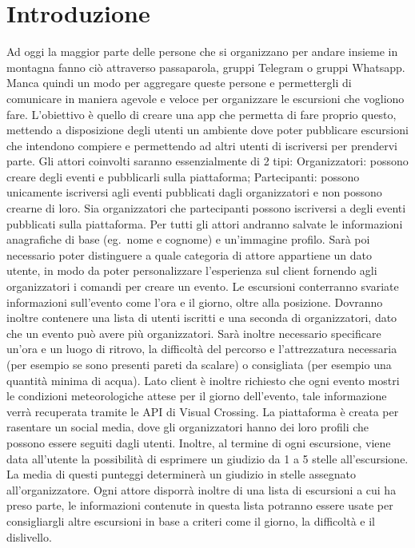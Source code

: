 \section{Introduzione}
Ad oggi la maggior parte delle persone che si organizzano per andare insieme in montagna fanno ciò attraverso passaparola, gruppi Telegram o gruppi Whatsapp. Manca quindi un modo per aggregare queste persone e permettergli di comunicare in maniera agevole e veloce per organizzare le escursioni che vogliono fare.
L'obiettivo è quello di creare una app che permetta di fare proprio questo, mettendo a disposizione degli utenti un ambiente dove poter pubblicare escursioni che intendono compiere e permettendo ad altri utenti di iscriversi per prendervi parte.
Gli attori coinvolti saranno essenzialmente di 2 tipi:
Organizzatori: possono creare degli eventi e pubblicarli sulla piattaforma;
Partecipanti: possono unicamente iscriversi agli eventi pubblicati dagli organizzatori e non possono crearne di loro. Sia organizzatori che partecipanti possono iscriversi a degli eventi pubblicati sulla piattaforma.
Per tutti gli attori andranno salvate le informazioni anagrafiche di base (eg.\ nome e cognome) e un'immagine profilo. Sarà poi necessario poter distinguere a quale categoria di attore appartiene un dato utente, in modo da poter personalizzare l’esperienza sul client fornendo agli organizzatori i comandi per creare un evento.
Le escursioni conterranno svariate informazioni sull’evento come l’ora e il giorno, oltre alla posizione. Dovranno inoltre contenere una lista di utenti iscritti e una seconda di organizzatori, dato che un evento può avere più organizzatori. Sarà inoltre necessario specificare un’ora e un luogo di ritrovo, la difficoltà del percorso e l’attrezzatura necessaria (per esempio se sono presenti pareti da scalare) o consigliata (per esempio una quantità minima di acqua). Lato client è inoltre richiesto che ogni evento mostri le condizioni meteorologiche attese per il giorno dell’evento, tale informazione verrà recuperata tramite le API di Visual Crossing.
La piattaforma è creata per rasentare un social media, dove gli organizzatori hanno dei loro profili che possono essere seguiti dagli utenti. Inoltre, al termine di ogni escursione, viene data all’utente la possibilità di esprimere un giudizio da 1 a 5 stelle all’escursione. La media di questi punteggi determinerà un giudizio in stelle assegnato all’organizzatore.
Ogni attore disporrà inoltre di una lista di escursioni a cui ha preso parte, le informazioni contenute in questa lista potranno essere usate per consigliargli altre escursioni in base a criteri come il giorno, la difficoltà e il dislivello.
